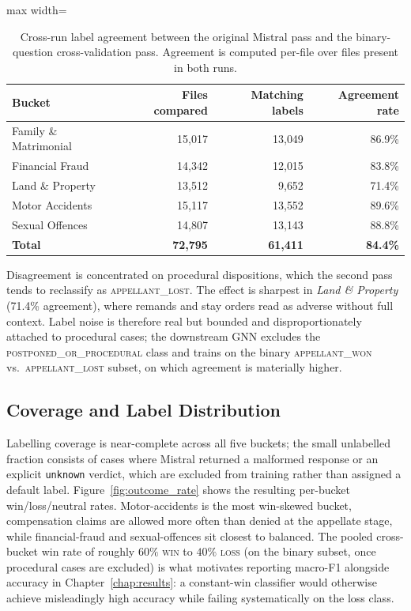 \begin{table}[H]
  \centering
  \small
  \begin{adjustbox}{max width=\textwidth}
  \begin{tabular}{lrrr}
    \toprule
    Bucket & Files compared & Matching labels & Agreement rate \\
    \midrule
    Family \& Matrimonial & 15{,}017 & 13{,}049 & 86.9\% \\
    Financial Fraud & 14{,}342 & 12{,}015 & 83.8\% \\
    Land \& Property & 13{,}512 & 9{,}652 & 71.4\% \\
    Motor Accidents & 15{,}117 & 13{,}552 & 89.6\% \\
    Sexual Offences & 14{,}807 & 13{,}143 & 88.8\% \\
    \midrule
    \textbf{Total} & \textbf{72{,}795} & \textbf{61{,}411} & \textbf{84.4\%} \\
    \bottomrule
  \end{tabular}
  \end{adjustbox}
  \caption{Cross-run label agreement between the original Mistral pass and the
  binary-question cross-validation pass. Agreement is computed per-file over
  files present in both runs.}
  \label{tab:crossval_agreement}
\end{table}

Disagreement is concentrated on procedural dispositions, which the
second pass tends to reclassify as \textsc{appellant\_lost}. The effect is
sharpest in \emph{Land \& Property} (71.4\% agreement), where remands and stay
orders read as adverse without full context. Label noise is therefore real
but bounded and disproportionately attached to procedural cases; the
downstream GNN excludes the \textsc{postponed\_or\_procedural} class and
trains on the binary \textsc{appellant\_won} vs.\ \textsc{appellant\_lost}
subset, on which agreement is materially higher.

\subsection{Coverage and Label Distribution}

Labelling coverage is near-complete across all five buckets; the small
unlabelled fraction consists of cases where Mistral returned a malformed
response or an explicit \texttt{unknown} verdict, which are excluded from
training rather than assigned a default label. Figure~\ref{fig:outcome_rate}
shows the resulting per-bucket win/loss/neutral rates. Motor-accidents is the
most win-skewed bucket, compensation claims are allowed more often than
denied at the appellate stage, while financial-fraud and sexual-offences
sit closest to balanced. The pooled cross-bucket win rate of roughly
$60\%$ \textsc{win} to $40\%$ \textsc{loss} (on the binary subset, once
procedural cases are excluded) is what motivates reporting macro-F1 alongside
accuracy in Chapter~\ref{chap:results}: a constant-win classifier would
otherwise achieve misleadingly high accuracy while failing systematically on
the loss class.

